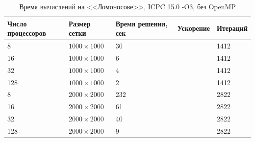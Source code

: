 \documentclass[12pt,notitlepage,oneside]{extarticle}
\begin{document}
\begin{table}[h]
\centering
\caption{Время вычислений на <<Ломоносове>>, ICPC 15.0 -O3, без OpenMP}
\label{lom:table}
\begin{tabular}{|l|l|l|l|l|}
\textbf{Число процессоров} & \textbf{Размер сетки} & \textbf{Время решения, сек} & \textbf{Ускорение} & \textbf{Итераций}      \\  \hline
8                          & $1000 \times 1000 $        & 30                            &                    & 1412                   \\
16                         & $1000 \times 1000 $        & 6                          &                    & 1412                   \\
32                         & $1000 \times 1000 $        & 4                         &                    & 1412                   \\
128                        & $1000 \times 1000 $        & 2                           &                    & 1412                   \\ \hline
8                          & $2000 \times 2000 $        & 232                            &                    & 2822                   \\
16                         & $2000 \times 2000 $        & 61                         &                    & 2822                   \\
32                         & $2000 \times 2000 $        & 40                         &                    & 2822                   \\
128                        & $2000 \times 2000 $        & 9                           &                    & 2822
\end{tabular}
\end{table}
\end{document}
